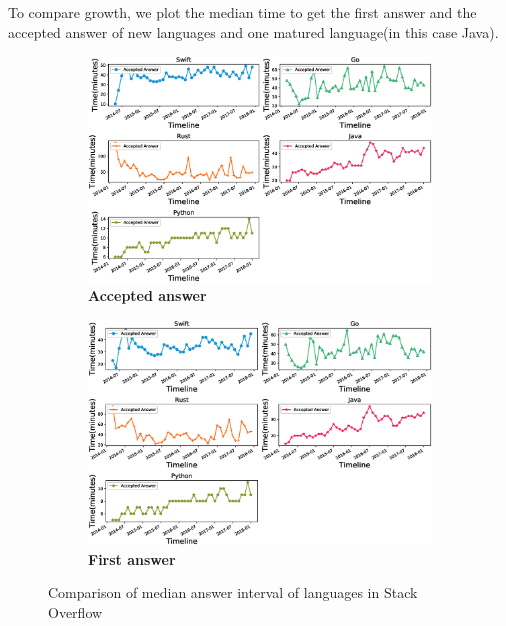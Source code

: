 To compare growth, we plot the median time to get the first answer and the accepted answer of new languages and one matured language(in this case Java).
\begin{figure}[htbp]
\begin{subfigure}{0.6\textwidth}
\centering
\hspace{-3cm}
\includegraphics[scale=0.38]{figures/AcceptedAnswerInterval.eps}
\caption{\textbf{Accepted answer}}
\label{fig:Accepted Answer interval}
\end{subfigure}
\begin{subfigure}{0.6\textwidth}
\centering
\hspace{-3cm}
\includegraphics[scale=0.38]{figures/FirstAnswerInterval.eps}
\caption{\textbf{First answer}}
\label{fig:First Answer interval}
\end{subfigure}
\caption{Comparison of median answer interval  of languages in Stack Overflow}
\label{fig:Answer intervals}
\end{figure}
